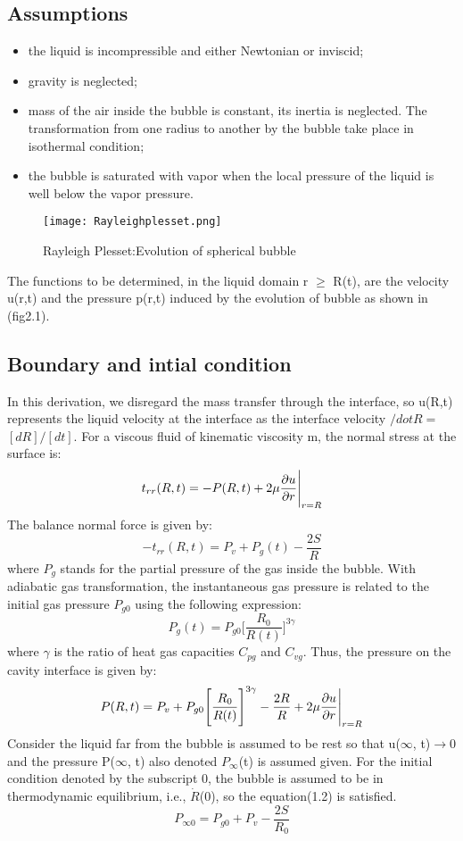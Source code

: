\subsection{Assumptions}
\begin{itemize}
\item the liquid is incompressible and either Newtonian or inviscid;
\item gravity is neglected;
\item mass of the air inside the bubble is constant, its inertia is neglected. The transformation from one radius to another by the bubble take place in isothermal condition;
\item the bubble is saturated with vapor when the local pressure of the liquid is well below the vapor pressure.
\end{itemize}
\begin{figure}[H]
 \centering
 \texttt{[image: Rayleighplesset.png]}
 \caption{Rayleigh Plesset:Evolution of spherical bubble}
  \label{fig:fig13}
\end{figure}
The functions to be determined, in the liquid domain r $\ge$ R(t), are the velocity u(r,t) and the pressure p(r,t) induced by the evolution of bubble as shown in (fig2.1).
\subsection{Boundary and intial condition}
In this derivation, we disregard the mass transfer through the interface, so u(R,t) represents the liquid velocity at the interface as the interface velocity $/dot R=$$[dR]/[dt]$.
For a viscous fluid of kinematic viscosity m, the normal stress at the surface is:
\begin{equation}
{t_{rr}}(R,t)=-P(R,t)+2{\mu}{\frac{\partial{u}}{\partial{r}}}\Bigg{\vert}_{r=R}
\end{equation}
The balance normal force is given by:
\begin{equation}
-{t_{rr}}(R,t)=P_{v}+{P_{g}}(t)-{\frac{2S}{R}}
\end{equation}
where $P_g$ stands for the partial pressure of the gas inside the bubble. With adiabatic gas transformation, the instantaneous gas pressure is related to the initial gas pressure 
$P_{g0}$ using the following expression:
\begin{equation}
{P_{g}}(t)=P_{g0}\Bigg[\frac{R_0}{R(t)}\Bigg]^{3\gamma}
\end{equation}
where $\gamma$ is the ratio of heat gas capacities $C_{pg}$ and $C_{vg}$.
Thus, the pressure on the cavity interface is given by:
\begin{equation}
P(R,t)=P_{v}+P_{g0}\Bigg[{\frac{R_0}{R(t)}}\Bigg]^{3\gamma}-{\frac{2R}{R}}+2\mu{\frac{\partial{u}}{\partial{r}}}\Bigg{\vert}_{r=R}
\end{equation}
Consider the liquid far from the bubble is assumed to be rest so that u($\infty$, t)$\rightarrow$0 and the pressure P($\infty$, t) also denoted $P_{\infty}$(t) is assumed given.
For the initial condition denoted by the subscript 0, the bubble is assumed to be in thermodynamic equilibrium, i.e., $\dot{R}$(0), so the equation(1.2) is satisfied.
\begin{equation}
P_{{\infty}{0}} =P_{g0}+P_v-\frac{2S}{R_0}
\end{equation}
